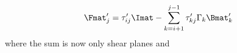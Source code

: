 \begin{equation}
\Fmat'_j = \tau'_{i j} \Imat - \sum\limits_{k = i + 1}^{j -1}\tau'_{k j} \Gamma_k \Bmat'_k
\end{equation}
where the sum is now only shear planes and